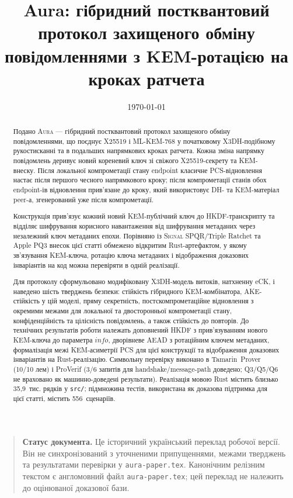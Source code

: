 \documentclass[11pt,a4paper]{article}
\title{\textbf{Aura: гібридний постквантовий протокол захищеного обміну\\
повідомленнями з KEM-ротацією на кроках ратчета}}
\author{\paperauthor}
\date{\today}
\theoremstyle{definition}
\renewcommand{\DH}{\textsf{X25519}}
\newcommand{\eCK}{\textsf{eCK}}
\newcommand{\Aura}{\mbox{\normalfont\scshape Aura}}
\newcommand{\Signal}{\mbox{\normalfont\scshape Signal}}
\newcommand{\SPQR}{\textsf{SPQR}}
\newcommand{\PQThree}{\textsf{PQ3}}
\begin{document}
\maketitle

\begin{quote}
\textbf{Статус документа.} Це історичний український переклад робочої версії.
Він не синхронізований з уточненими припущеннями, межами тверджень та
результатами перевірки у \texttt{aura-paper.tex}. Канонічним релізним текстом є
англомовний файл \texttt{aura-paper.tex}; цей переклад не належить до
оцінюваної доказової бази.
\end{quote}

\begin{abstract}
\noindent
Подано \Aura{} — гібридний постквантовий протокол захищеного обміну
повідомленнями, що поєднує X25519 і ML-KEM-768 у початковому
X3DH-подібному рукостисканні та в подальших напрямкових кроках ратчета.
Кожна зміна напрямку повідомлень деривує новий кореневий ключ зі свіжого
\DH{}-секрету та KEM-внеску. Після локальної компрометації стану endpoint
класичне PCS-відновлення настає після першого чесного напрямкового кроку;
після компрометації станів обох endpoint-ів відновлення прив'язане до
кроку, який використовує DH- та KEM-матеріал peer-а, згенерований уже
після компрометації.

Конструкція прив'язує кожний новий KEM-публічний ключ до HKDF-транскрипту
та відділяє шифрування корисного навантаження від шифрування метаданих
через незалежний ключ метаданих епохи. Порівняно із \Signal{}
\SPQR{}/Triple Ratchet та Apple \PQThree{} внесок цієї статті обмежено
відкритим Rust-артефактом, у якому зв'язування KEM-ключа, ротацію ключа
метаданих і відображення доказових інваріантів на код можна перевіряти в
одній реалізації.

Для протоколу сформульовано модифіковану X3DH-модель витоків, натхненну \eCK{}, і наведено
шість тверджень безпеки: стійкість гібридного KEM-комбінатора,
AKE-стійкість у цій моделі, пряму секретність, постскомпрометаційне
відновлення з окремими межами для локальної та двосторонньої компрометації
стану, конфіденційність та цілісність повідомлень, а також стійкість
до повторів. До технічних результатів роботи належать доповнений HKDF з
прив'язуванням нового KEM-ключа до параметра $\mathit{info}$,
дворівневе AEAD з ротаційним ключем метаданих, формалізація
межі KEM-асиметрії PCS для цієї конструкції та відображення доказових
інваріантів на Rust-реалізацію. Символьну перевірку виконано в
Tamarin~Prover (10/10 лем) і ProVerif (3/6 запитів для handshake/message-path
доведено; Q3/Q5/Q6 не враховано як машинно-доведені результати). Реалізація мовою
Rust містить близько 35{,}9~тис. рядків у \texttt{src/}; підмножина
тестів, використана як доказова підтримка для цієї статті, містить
556~сценаріїв.
\end{abstract}
\end{document}
